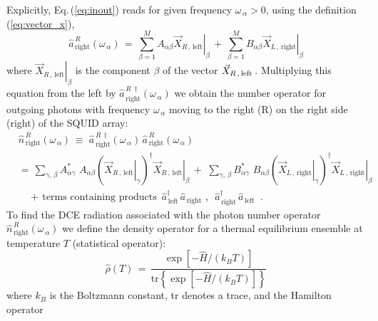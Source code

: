 Explicitly, Eq.\,(\ref{eq:inout}) reads for given frequency $\omega_{\,\alpha} > 0$, 
using the definition (\ref{eq:vector_x}),
%
\begin{equation} \label{eq:abcdexplicit}
\hat{a}_{\,\text{right}}^{\,R}(\omega_{\,\alpha}) \, = \, 
\sum_{\beta=1}^M A_{\alpha \beta}  \left. \vec{X}_{R\,,\,\text{left}} \right|_{\beta} \, + \,
\sum_{\beta=1}^M B_{\alpha \beta}  \left. \vec{X}_{L\,,\,\text{right}} \right|_{\beta}
\end{equation}
%
where $\displaystyle{\left. \vec{X}_{R\,,\,\text{left}} \right|_{\beta}}$ is the 
component $\beta$ of the vector $\displaystyle{\vec{X}_{R\,,\,\text{left\,}}}$. 
Multiplying this equation from the left by $\hat{a}_{\,\text{right}}^{\,R\,\dagger}(\omega_{\,\alpha})$
we obtain the number operator for outgoing photons with frequency $\omega_{\,\alpha}$ 
moving to the right (R) on the right side (right) of the SQUID array:
%
\begin{equation} \label{eq:numberop} 
\begin{split}
& \hat{n}_{\,\text{right}}^{\,R}(\omega_{\,\alpha}) \, \equiv \, \, 
\hat{a}_{\,\text{right}}^{\,R\,\dagger}(\omega_{\,\alpha}) \, 
\hat{a}_{\,\text{right}}^{\,R}(\omega_{\,\alpha}) \\[3mm]
& = \, \sum\limits_{\gamma, \, \beta} A_{\alpha \gamma}^* \, \, A_{\alpha \beta}  
\left( \left. \vec{X}_{R\,,\,\text{left}} \right|_{\gamma} \right)^{\dagger}
\left. \vec{X}_{R\,,\,\text{left}} \right|_{\beta} \, + \,
\, \sum\limits_{\gamma, \, \beta} B_{\alpha \gamma}^* \, \, B_{\alpha \beta}  
\left( \left. \vec{X}_{L\,,\,\text{right}} \right|_{\gamma} \right)^{\dagger}
\left. \vec{X}_{L\,,\,\text{right}} \right|_{\beta} \\[3mm]
& \quad + \, \text{terms containing products} \, \, \, 
\hat{a}_{\,\text{left}}^{\dagger} \, \hat{a}_{\,\text{right}} \, \, , \, \, \, 
\hat{a}_{\,\text{right}}^{\dagger} \, \hat{a}_{\,\text{left}}
\, \, \, .
\end{split}
\end{equation}
%
To find the DCE radiation associated with the photon number operator 
$\hat{n}_{\,\text{right}}^{\,R}(\omega_{\,\alpha})$ 
we define the density operator for a thermal equilibrium ensemble at temperature $T$
(statistical operator):
%
\begin{equation} \label{eq:do}
\hat{\rho}(T) \, = \, \frac{\exp\left[ - \hat{H} / (k_B T) \right]}{  \text{tr} \left\{ \exp\left[ - \hat{H} / (k_B T) \right] \right\}}
\end{equation}
%
where $k_B$ is the Boltzmann constant, tr denotes a trace, and the Hamilton operator 
